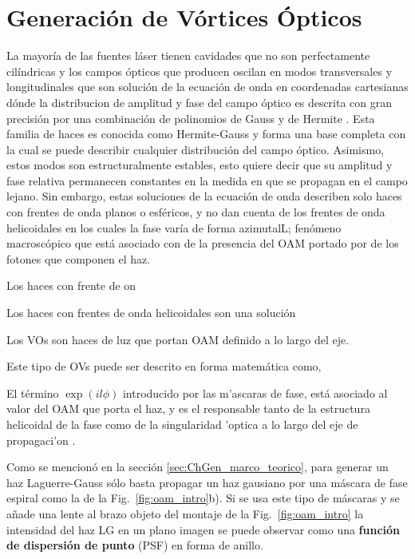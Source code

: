 \chapter{Generación de Vórtices Ópticos}
\label{sec:OV_gen}

La mayoría de las fuentes láser tienen cavidades que no son
perfectamente cilíndricas y los campos ópticos que producen oscilan en
modos transversales y longitudinales que son solución de la ecuación
de onda en coordenadas cartesianas dónde la distribucion de amplitud y fase
del campo óptico es descrita con gran precisión por una
combinación de polinomios de Gauss y de Hermite
. Esta familia de haces es conocida como
Hermite-Gauss y forma una base completa con la cual se puede describir
cualquier distribución del campo óptico. Asimismo, estos modos son
estructuralmente estables, esto quiere decir que su amplitud y fase
relativa permanecen constantes en la medida en que se propagan en el
campo lejano. Sin embargo, estas soluciones de la ecuación de onda
describen solo haces con frentes de onda planos o esféricos, y no dan
cuenta de los frentes de onda helicoidales en los cuales la fase varía
de forma azimutalL; fenómeno macroscópico que está asociado con de la
presencia del \acrshort{OAM} portado por de los fotones que componen
el haz.

Los haces con frente de on



Los haces con frentes de onda helicoidales son una solución 

Los VOs son haces de luz que portan OAM definido a lo largo del eje.

Este tipo de OVs puede ser descrito en forma matemática como, 

El término $\exp{(il\phi)}$ introducido por las m'ascaras de fase, está asociado al valor del
\acrshort{OAM} que porta el haz, y es el responsable tanto de la
estructura helicoidal de la fase como de la singularidad 'optica a lo
largo del eje de propagaci'on .   

Como se mencionó en la sección \ref{sec:ChGen_marco_teorico}, para generar un haz
Laguerre-Gauss sólo basta propagar un haz gausiano por una máscara de
fase espiral como la de la Fig.~\ref{fig:oam_intro}b). Si se usa este 
tipo de máscaras y se añade una lente al brazo objeto del montaje de
la Fig.~\ref{fig:oam_intro} la intensidad del haz \acrshort{LG} en un
plano imagen se puede observar 
como una \textbf{función de dispersión de punto} (\acrshort{PSF}) en forma
de anillo.  


